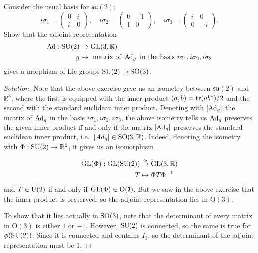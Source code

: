 \documentclass{report}
\begin{document}
\begin{exercise}[Exercise 2.8]
    Consider the usual basis for $\mathfrak{su}(2)$:
    \[
    i \sigma_1 = \begin{pmatrix} 0 & i \\ i & 0 \end{pmatrix}, \quad 
    i\sigma_2 = \begin{pmatrix} 0 & -1 \\ 1 & 0 \end{pmatrix}, \quad 
    i \sigma_3 = \begin{pmatrix} i & 0 \\ 0 & -i \end{pmatrix}.
    \]
    Show that the adjoint representation
    \begin{align*}
        \operatorname{Ad}: \operatorname{{\mathrm{SU}}}(2) &\to \operatorname{{\mathrm{GL}}}(3, \mathbb R)\\
        g &\mapsto \text{ matrix of } \operatorname{Ad}_g \text{ in the basis } i\sigma_1, i\sigma_2, i\sigma_3
    \end{align*}
    gives a morphism of Lie groups $\operatorname{{\mathrm{SU}}}(2) \to \operatorname{{\mathrm{SO}}}(3)$.
\end{exercise}
\begin{proof}[Solution]
    Note that the above exercise gave us an isometry between $\mathfrak{su}(2)$ and $\mathbb R^3$, where the first is equipped with the inner product $(a,b) = \operatorname{tr}(ab^*)/2$ and the second with the standard euclidean inner product.
    Denoting with $[\operatorname{Ad}_g]$ the matrix of $\operatorname{Ad}_g$ in the basis $i \sigma_1, i \sigma_2, i \sigma_3$, the above isometry tells us $\operatorname{Ad}_g$ preserves the given inner product if and only if the matrix $[\operatorname{Ad}_g]$ preserves the standard euclidean inner product, i.e.\ $[Ad_g] \in \operatorname{{\mathrm{SO}}}(3, \mathbb R)$.
    Indeed, denoting the isometry with $\Phi: \operatorname{{\mathrm{SU}}}(2) \to \mathbb R^2$, it gives us an isomorphism 
    
    \begin{align*}
        \operatorname{{\mathrm{GL}}}(\Phi): \operatorname{{\mathrm{GL}}}(\operatorname{{\mathrm{SU}}}(2)) &\overset{\simeq}{\to} \operatorname{{\mathrm{GL}}}(3, \mathbb R)\\
        T &\mapsto \Phi T \Phi^{-1}
    \end{align*}
    and $T \in \operatorname{{\mathrm{U}}}(2)$ if and only if $\operatorname{{\mathrm{GL}}}(\Phi) \in \mathrm{O}(3)$.
    But we saw in the above exercise that the inner product is preserved, so the adjoint representation lies in $\mathrm{O}(3)$.

    To show that it lies actually in $\operatorname{{\mathrm{SO}}}(3)$, note that the determinant of every matrix in $\mathrm{O}(3)$ is either $1$ or $-1$.
    However, $\operatorname{{\mathrm{SU}}}(2)$ is connected, so the same is true for $\phi(\operatorname{{\mathrm{SU}}}(2))$.
    Since it is connected and contains $I_3$, so the determinant of the adjoint representation must be $1$.
\end{proof}
\end{document}
